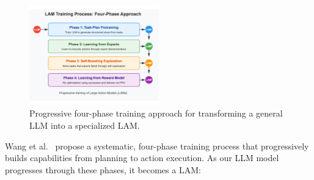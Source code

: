 \documentclass[journal,twoside,10pt]{IEEEtran}
\begin{document}
\begin{figure}[htbp]
    \centering
    \includegraphics[width=0.5\textwidth]{traning_phases.pdf}
    \caption{Progressive four-phase training approach for transforming a general LLM into a specialized LAM.}
    \label{fig:lam-training}
\end{figure}

Wang et al.~\cite{wang2025lam} propose a systematic, four-phase training process that progressively builds capabilities from planning to action execution. As our LLM model progresses through these phases, it becomes a LAM:
\end{document}
